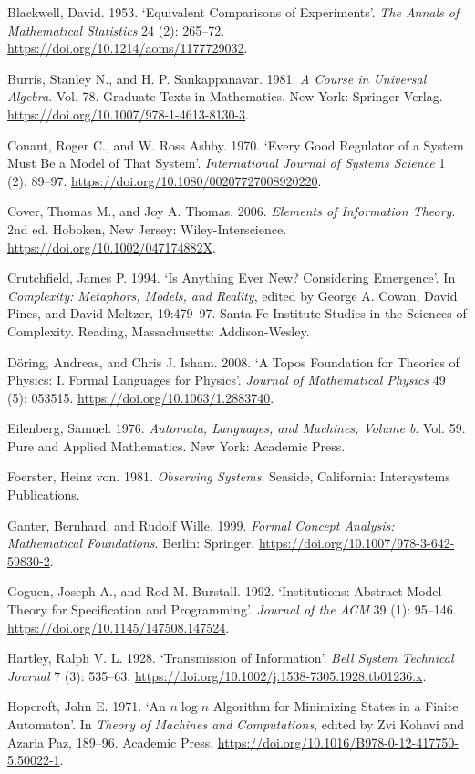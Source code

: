 \documentclass[11pt,a4paper]{article}
\begin{document}
Blackwell, David. 1953. `Equivalent Comparisons of Experiments'.
\emph{The Annals of Mathematical Statistics} 24 (2): 265--72.
\url{https://doi.org/10.1214/aoms/1177729032}.

Burris, Stanley N., and H. P. Sankappanavar. 1981. \emph{A Course in
Universal Algebra}. Vol. 78. Graduate Texts in Mathematics. New York:
Springer-Verlag. \url{https://doi.org/10.1007/978-1-4613-8130-3}.

Conant, Roger C., and W. Ross Ashby. 1970. `Every Good Regulator of a
System Must Be a Model of That System'. \emph{International Journal of
Systems Science} 1 (2): 89--97.
\url{https://doi.org/10.1080/00207727008920220}.

Cover, Thomas M., and Joy A. Thomas. 2006. \emph{Elements of Information
Theory}. 2nd ed. Hoboken, New Jersey: Wiley-Interscience.
\url{https://doi.org/10.1002/047174882X}.

Crutchfield, James P. 1994. `Is Anything Ever New? Considering
Emergence'. In \emph{Complexity: Metaphors, Models, and Reality}, edited
by George A. Cowan, David Pines, and David Meltzer, 19:479--97. Santa Fe
Institute Studies in the Sciences of Complexity. Reading, Massachusetts:
Addison-Wesley.

Döring, Andreas, and Chris J. Isham. 2008. `A Topos Foundation for
Theories of Physics: I. Formal Languages for Physics'. \emph{Journal of
Mathematical Physics} 49 (5): 053515.
\url{https://doi.org/10.1063/1.2883740}.

Eilenberg, Samuel. 1976. \emph{Automata, Languages, and Machines, Volume
b}. Vol. 59. Pure and Applied Mathematics. New York: Academic Press.

Foerster, Heinz von. 1981. \emph{Observing Systems}. Seaside,
California: Intersystems Publications.

Ganter, Bernhard, and Rudolf Wille. 1999. \emph{Formal Concept Analysis:
Mathematical Foundations}. Berlin: Springer.
\url{https://doi.org/10.1007/978-3-642-59830-2}.

Goguen, Joseph A., and Rod M. Burstall. 1992. `Institutions: Abstract
Model Theory for Specification and Programming'. \emph{Journal of the
ACM} 39 (1): 95--146. \url{https://doi.org/10.1145/147508.147524}.

Hartley, Ralph V. L. 1928. `Transmission of Information'. \emph{Bell
System Technical Journal} 7 (3): 535--63.
\url{https://doi.org/10.1002/j.1538-7305.1928.tb01236.x}.

Hopcroft, John E. 1971. `An \(n\log n\) Algorithm for Minimizing States
in a Finite Automaton'. In \emph{Theory of Machines and Computations},
edited by Zvi Kohavi and Azaria Paz, 189--96. Academic Press.
\url{https://doi.org/10.1016/B978-0-12-417750-5.50022-1}.
\end{document}
